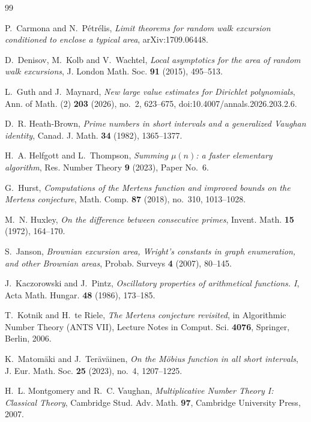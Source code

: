 \documentclass[11pt]{amsart}
\numberwithin{equation}{section}
\theoremstyle{plain}
\theoremstyle{definition}
\theoremstyle{remark}
\begin{document}
\begin{thebibliography}{99}

P.~Carmona and N.~P\'etr\'elis, \emph{Limit theorems for random walk excursion
conditioned to enclose a typical area}, arXiv:1709.06448.

D.~Denisov, M.~Kolb and V.~Wachtel, \emph{Local asymptotics for the area of
random walk excursions}, J. London Math. Soc. \textbf{91} (2015), 495--513.

L.~Guth and J.~Maynard, \emph{New large value estimates for Dirichlet
polynomials}, Ann. of Math. (2) \textbf{203} (2026), no.~2, 623--675,
doi:10.4007/annals.2026.203.2.6.

D.~R. Heath-Brown, \emph{Prime numbers in short intervals and a generalized
Vaughan identity}, Canad. J. Math. \textbf{34} (1982), 1365--1377.

H.~A. Helfgott and L.~Thompson, \emph{Summing $\mu(n)$: a faster elementary
algorithm}, Res. Number Theory \textbf{9} (2023), Paper No.~6.

G.~Hurst, \emph{Computations of the Mertens function and improved bounds on
the Mertens conjecture}, Math. Comp. \textbf{87} (2018), no.~310, 1013--1028.

M.~N. Huxley, \emph{On the difference between consecutive primes}, Invent.
Math. \textbf{15} (1972), 164--170.

S.~Janson, \emph{Brownian excursion area, Wright's constants in graph
enumeration, and other Brownian areas}, Probab. Surveys \textbf{4} (2007),
80--145.

J.~Kaczorowski and J.~Pintz, \emph{Oscillatory properties of arithmetical
functions. I}, Acta Math. Hungar. \textbf{48} (1986), 173--185.

T.~Kotnik and H.~te Riele, \emph{The Mertens conjecture revisited}, in
Algorithmic Number Theory (ANTS VII), Lecture Notes in Comput. Sci.
\textbf{4076}, Springer, Berlin, 2006.

K.~Matom\"aki and J.~Ter\"av\"ainen, \emph{On the M\"obius function in all
short intervals}, J. Eur. Math. Soc. \textbf{25} (2023), no.~4, 1207--1225.

H.~L. Montgomery and R.~C. Vaughan, \emph{Multiplicative Number Theory I:
Classical Theory}, Cambridge Stud. Adv. Math. \textbf{97}, Cambridge
University Press, 2007.


\end{thebibliography}
\end{document}

